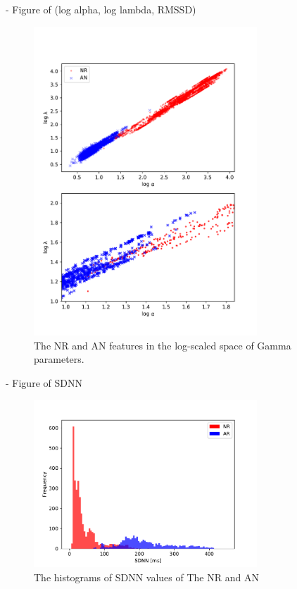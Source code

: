 \documentclass[times,twocolumn,final,authoryear]{elsarticle}
\begin{document}
- Figure of (log alpha, log lambda, RMSSD)
\begin{figure}[!t]
\centering
\includegraphics[width=8.4cm]{Fig_gamma_params.pdf}
\caption{The NR and AN features in the log-scaled space of Gamma parameters.}
\label{fig_features_gamma}
\end{figure}
- Figure of SDNN
\begin{figure}[!t]
\centering
\includegraphics[width=8.4cm]{Fig_hist_SDNN.pdf}
\caption{The histograms of SDNN values of The NR and AN}
\label{fig_features_sdnn}
\end{figure}
\end{document}
